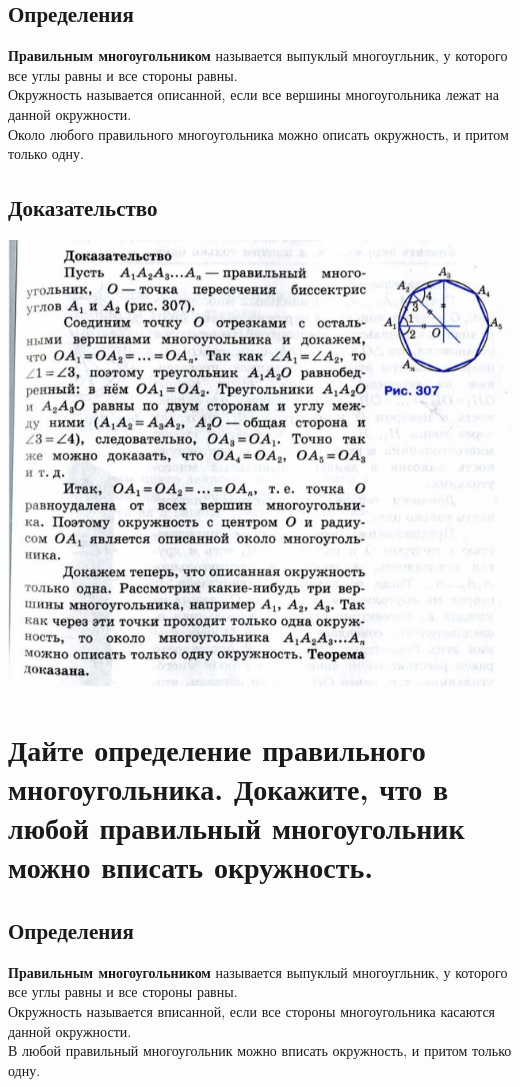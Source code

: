 \documentclass[12pt, letterpaper]{article}
\begin{document}
\subsection{Определения}
\textbf{Правильным многоугольником} называется выпуклый многоугльник, у которого все углы равны и все стороны равны. \\
Окружность называется описанной, если все вершины многоугольника лежат на данной окружности. \\
Около любого правильного многоугольника можно описать окружность, и притом только одну. \\
\subsection{Доказательство}
\includegraphics[scale=0.3]{photo4.jpg}

\section {Дайте определение правильного многоугольника. Докажите, что в любой правильный многоугольник можно вписать окружность.}
\subsection{Определения}
\textbf{Правильным многоугольником} называется выпуклый многоугльник, у которого все углы равны и все стороны равны. \\
Окружность называется вписанной, если все стороны многоугольника касаются данной окружности. \\
В любой правильный многоугольник можно вписать окружность, и притом только одну. \\
\end{document}
